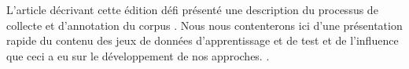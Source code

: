 
\label{sec:corpus} 

 L'article décrivant cette édition défi présenté une description du processus de collecte et d'annotation du corpus \cite{Paroubek-2018}.
 Nous nous contenterons ici d'une présentation rapide du contenu des jeux de données d'apprentissage et de test et de l'influence que ceci a eu sur le développement de nos approches.
.
